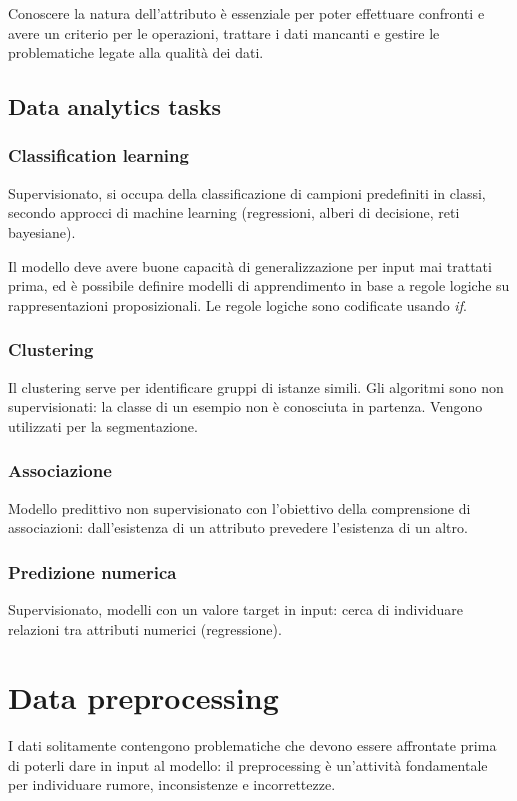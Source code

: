 Conoscere la natura dell'attributo è essenziale per poter effettuare confronti e avere un criterio per le operazioni, trattare i dati mancanti e gestire le problematiche legate alla qualità dei dati.

\subsection{Data analytics tasks}
\subsubsection{Classification learning}
Supervisionato, si occupa della classificazione di campioni predefiniti in classi, secondo approcci di machine learning (regressioni, alberi di decisione, reti bayesiane). 

Il modello deve avere buone capacità di generalizzazione per input mai trattati prima, ed è possibile definire modelli di apprendimento in base a regole logiche su rappresentazioni proposizionali. Le regole logiche sono codificate usando \textit{if}.

\subsubsection{Clustering}
Il clustering serve per identificare gruppi di istanze simili. Gli algoritmi sono non supervisionati: la classe di un esempio non è conosciuta in partenza. Vengono utilizzati per la segmentazione.

\subsubsection{Associazione}
Modello predittivo non supervisionato con l'obiettivo della comprensione di associazioni: dall'esistenza di un attributo prevedere l'esistenza di un altro.

\subsubsection{Predizione numerica}
Supervisionato, modelli con un valore target in input: cerca di individuare relazioni tra attributi numerici (regressione).

\section{Data preprocessing}
I dati solitamente contengono problematiche che devono essere affrontate prima di poterli dare in input al modello: il preprocessing è un'attività fondamentale per individuare rumore, inconsistenze e incorrettezze.


